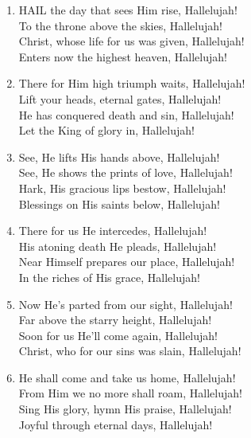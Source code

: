 \documentclass[11pt,a4paper]{article}
\begin{document}
\begin{enumerate}
    \item HAIL the day that sees Him rise, Hallelujah! \\
        To the throne above the skies, Hallelujah! \\
        Christ, whose life for us was given, Hallelujah! \\
        Enters now the highest heaven, Hallelujah!

    \item There for Him high triumph waits, Hallelujah! \\
        Lift your heads, eternal gates, Hallelujah! \\
        He has conquered death and sin, Hallelujah! \\
        Let the King of glory in, Hallelujah!

    \item See, He lifts His hands above, Hallelujah! \\
        See, He shows the prints of love, Hallelujah! \\
        Hark, His gracious lips bestow, Hallelujah! \\
        Blessings on His saints below, Hallelujah!

    \item There for us He intercedes, Hallelujah! \\
        His atoning death He pleads, Hallelujah! \\
        Near Himself prepares our place, Hallelujah! \\
        In the riches of His grace, Hallelujah!

    \item Now He's parted from our sight, Hallelujah! \\
        Far above the starry height, Hallelujah! \\
        Soon for us He'll come again, Hallelujah! \\
        Christ, who for our sins was slain, Hallelujah!

    \item He shall come and take us home, Hallelujah! \\
        From Him we no more shall roam, Hallelujah! \\
        Sing His glory, hymn His praise, Hallelujah! \\
        Joyful through eternal days, Hallelujah!

\end{enumerate}
\end{document}
